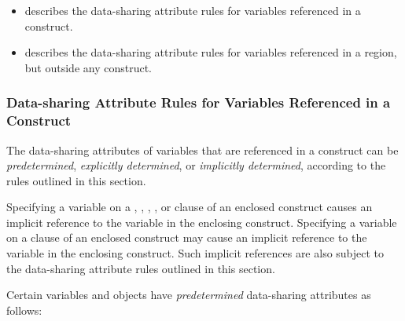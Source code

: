 \begin{itemize}
\item {}
describes the data-sharing attribute rules for variables
referenced in a construct.

\item {} describes the data-sharing attribute rules for variables
referenced in a region, but outside any construct.
\end{itemize}









\subsubsection{Data-sharing Attribute Rules for Variables Referenced in a Construct}
\label{subsubsec:Data-sharing Attribute Rules for Variables Referenced in a Construct}
The data-sharing attributes of variables that are referenced in a construct can be
\emph{predetermined}, \emph{explicitly determined}, or \emph{implicitly determined}, according to the rules
outlined in this section.

Specifying a variable on a , , , ,
or  clause of an enclosed construct causes an implicit reference to the
variable in the enclosing construct. Specifying a variable on a  clause of an enclosed
construct may cause an implicit reference to the variable in the enclosing construct.
Such implicit references are also subject to the data-sharing attribute rules outlined in
this section.

Certain variables and objects have \emph{predetermined} data-sharing attributes as follows:

